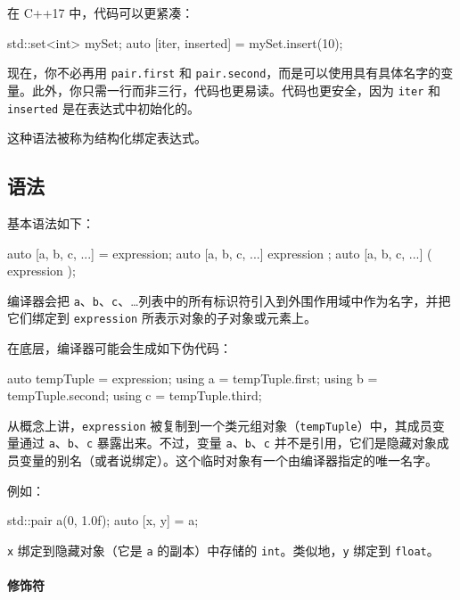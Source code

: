 在 C++17 中，代码可以更紧凑：

\begin{codebox}[cpp]
std::set<int> mySet;
auto [iter, inserted] = mySet.insert(10);
\end{codebox}

现在，你不必再用 \texttt{pair.first} 和 \texttt{pair.second}，而是可以使用具有具体名字的变量。此外，你只需一行而非三行，代码也更易读。代码也更安全，因为 \texttt{iter} 和 \texttt{inserted} 是在表达式中初始化的。

这种语法被称为结构化绑定表达式。

\subsection{语法}

基本语法如下：

\begin{codebox}[cpp]
auto [a, b, c, ...] = expression;
auto [a, b, c, ...] { expression };
auto [a, b, c, ...] ( expression );
\end{codebox}

编译器会把 \texttt{a}、\texttt{b}、\texttt{c}、\ldots 列表中的所有标识符引入到外围作用域中作为名字，并把它们绑定到 \texttt{expression} 所表示对象的子对象或元素上。

在底层，编译器可能会生成如下伪代码：

\begin{codebox}[cpp]
auto tempTuple = expression;
using a = tempTuple.first;
using b = tempTuple.second;
using c = tempTuple.third;
\end{codebox}

从概念上讲，\texttt{expression} 被复制到一个类元组对象（\texttt{tempTuple}）中，其成员变量通过 \texttt{a}、\texttt{b}、\texttt{c} 暴露出来。不过，变量 \texttt{a}、\texttt{b}、\texttt{c} 并不是引用，它们是隐藏对象成员变量的别名（或者说绑定）。这个临时对象有一个由编译器指定的唯一名字。

例如：

\begin{codebox}[cpp]
std::pair a(0, 1.0f);
auto [x, y] = a;
\end{codebox}

\texttt{x} 绑定到隐藏对象（它是 \texttt{a} 的副本）中存储的 \texttt{int}。类似地，\texttt{y} 绑定到 \texttt{float}。

\paragraph{修饰符}

